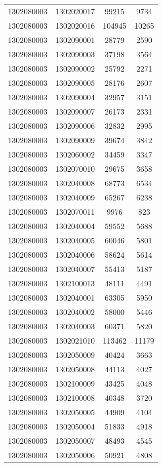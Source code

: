 \begin{longtable}[h]{llcc}
		1302080003 & 1302020017 & 99215 & 9734\\
		1302080003 & 1302020016 & 104945 & 10265\\
		1302080003 & 1302090001 & 28779 & 2590\\
		1302080003 & 1302090003 & 37198 & 3564\\
		1302080003 & 1302090002 & 25792 & 2271\\
		1302080003 & 1302090005 & 28176 & 2607\\
		1302080003 & 1302090004 & 32957 & 3151\\
		1302080003 & 1302090007 & 26173 & 2331\\
		1302080003 & 1302090006 & 32832 & 2995\\
		1302080003 & 1302090009 & 39674 & 3842\\
		1302080003 & 1302060002 & 34459 & 3347\\
		1302080003 & 1302070010 & 29675 & 3658\\
		1302080003 & 1302040008 & 68773 & 6534\\
		1302080003 & 1302040009 & 65267 & 6238\\
		1302080003 & 1302070011 & 9976 & 823\\
		1302080003 & 1302040004 & 59552 & 5688\\
		1302080003 & 1302040005 & 60046 & 5801\\
		1302080003 & 1302040006 & 58624 & 5614\\
		1302080003 & 1302040007 & 55413 & 5187\\
		1302080003 & 1302100013 & 48111 & 4491\\
		1302080003 & 1302040001 & 63305 & 5950\\
		1302080003 & 1302040002 & 58000 & 5446\\
		1302080003 & 1302040003 & 60371 & 5820\\
		1302080003 & 1302021010 & 113462 & 11179\\
		1302080003 & 1302050009 & 40424 & 3663\\
		1302080003 & 1302050008 & 44113 & 4027\\
		1302080003 & 1302100009 & 43425 & 4048\\
		1302080003 & 1302100008 & 40348 & 3720\\
		1302080003 & 1302050005 & 44909 & 4104\\
		1302080003 & 1302050004 & 51833 & 4918\\
		1302080003 & 1302050007 & 48493 & 4545\\
		1302080003 & 1302050006 & 50921 & 4808\\

\end{longtable}
